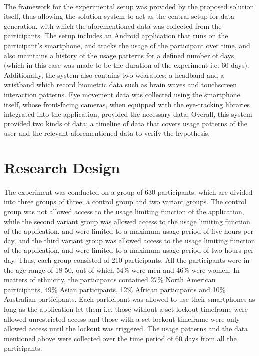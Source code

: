 \documentclass{article}
\begin{document}
\paragraph{}The framework for the experimental setup was provided by the proposed solution itself, thus allowing the solution system to act as the central setup for data generation, with which the aforementioned data was collected from the participants. The setup includes an Android application that runs on the participant's smartphone, and tracks the usage of the participant over time, and also maintains a history of the usage patterns for a defined number of days (which in this case was made to be the duration of the experiment i.e. 60 days). Additionally, the system also contains two wearables; a headband and a wristband which record biometric data such as brain waves and touchscreen interaction patterns. Eye movement data was collected using the smartphone itself, whose front-facing cameras, when equipped with the eye-tracking libraries integrated into the application, provided the necessary data. Overall, this system provided two kinds of data; a timeline of data that covers usage patterns of the user and the relevant aforementioned data to verify the hypothesis.

\section{Research Design}
\paragraph{}The experiment was conducted on a group of 630 participants, which are divided into three groups of three; a control group and two variant groups. The control group was not allowed access to the usage limiting function of the application, while the second variant group was allowed access to the usage limiting function of the application, and were limited to a maximum usage period of five hours per day, and the third variant group was allowed access to the usage limiting function of the application, and were limited to a maximum usage period of two hours per day. Thus, each group consisted of 210 participants. All the participants were in the age range of 18-50, out of which 54\% were men and 46\% were women. In matters of ethnicity, the participants contained 27\% North American participants, 49\% Asian participants, 12\% African participants and 10\% Australian participants. Each participant was allowed to use their smartphones as long as the application let them i.e. those without a set lockout timeframe were allowed unrestricted access and those with a set lockout timeframe were only allowed access until the lockout was triggered. The usage patterns and the data mentioned above were collected over the time period of 60 days from all the participants. 
\end{document}
